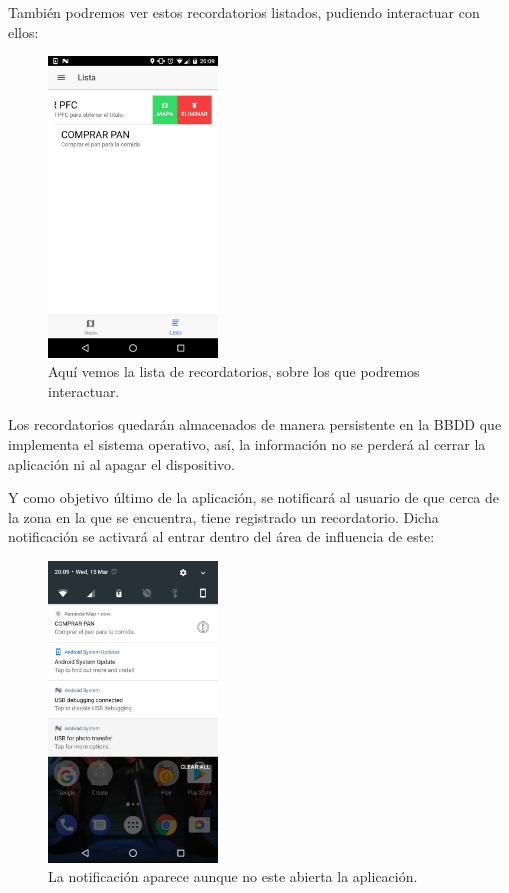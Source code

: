 También podremos ver estos recordatorios listados, pudiendo interactuar con ellos:

\begin{figure}[H]
\centering
    \centering
        \includegraphics[width=0.4\textwidth]{Figures/ch2/ReminderMap/preview_list}
    \caption{Aquí vemos la lista de recordatorios, sobre los que podremos interactuar.}
\end{figure}

Los recordatorios quedarán almacenados de manera persistente en la \gls{BBDD} que implementa el sistema operativo, así, la información no se perderá al cerrar la aplicación ni al apagar el dispositivo.

Y como objetivo último de la aplicación, se notificará al usuario de que cerca de la zona en la que se encuentra, tiene registrado un recordatorio. Dicha notificación  se activará al entrar dentro del área de influencia de este:

\begin{figure}[H]
\centering
    \centering
        \includegraphics[width=0.4\textwidth]{Figures/ch2/ReminderMap/preview_alert}
    \caption{La notificación aparece aunque no este abierta la aplicación.}
\end{figure}

